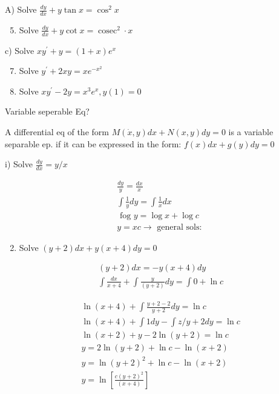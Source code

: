 \documentclass[10pt]{article}
\begin{document}
A) Solve $\frac{d y}{d x}+y \tan x=\cos ^{2} x$

\begin{enumerate}
  \setcounter{enumi}{4}
  \item Solve $\frac{d y}{d x}+y \cot x=\operatorname{cosec}^{2} \cdot x$
\end{enumerate}

c) Solve $x y^{\prime}+y=(1+x) e^{x}$

\begin{enumerate}
  \setcounter{enumi}{6}
  \item Solve $y^{\prime}+2 x y=x e^{-x^{2}}$

  \item Solve $x y^{\prime}-2 y=x^{3} e^{x}, y(1)=0$

\end{enumerate}

Variable seperable Eq?

A differential eq of the form $M(\dot{x}, y) d x+N(x, y) d y=0$ is a variable separable ep. if it can be expressed in the form: $f(x) d x+g(y) d y=0$

i) Solve $\frac{d y}{d x}=y / x$

$$
\begin{aligned}
& \frac{d y}{y}=\frac{d x}{x} \\
& \int \frac{1}{y} d y=\int \frac{1}{x} d x \\
& \text { fog } y=\log x+\log c \\
& y=x c \rightarrow \text { general sols: }
\end{aligned}
$$

\begin{enumerate}
  \setcounter{enumi}{1}
  \item Solve $(y+2) d x+y(x+4) d y=0$
\end{enumerate}

$$
\begin{aligned}
& (y+2) d x=-y(x+4) d y \\
& \int \frac{d x}{x+4}+\int \frac{y}{(y+2)} d y=\int 0+\ln c
\end{aligned}
$$

$$
\begin{aligned}
& \ln (x+4)+\int \frac{y+2-2}{y+2} d y=\ln c \\
& \ln (x+4)+\int 1 d y-\int z / y+2 d y=\ln c \\
& \ln (x+2)+y-2 \ln (y+2)=\ln c \\
& y=2 \ln (y+2)+\ln c-\ln (x+2) \\
& y=\ln (y+2)^{2}+\ln c-\ln (x+2) \\
& y=\ln \left[\frac{c(y+2)^{2}}{(x+4)}\right]
\end{aligned}
$$
\end{document}
